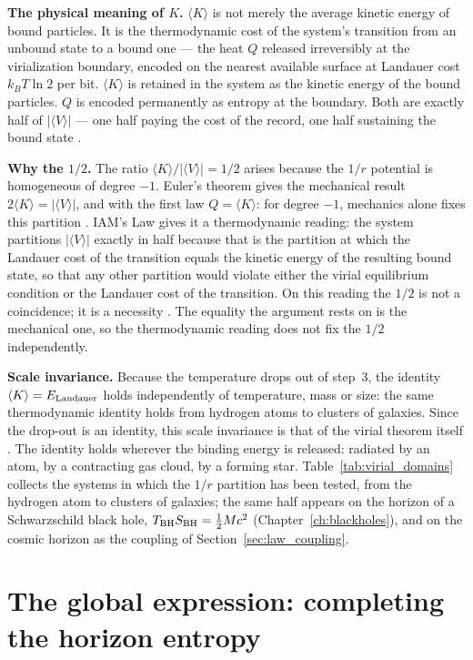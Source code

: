 \textbf{The physical meaning of $K$.} $\langle K\rangle$ is not merely the average kinetic energy of bound particles. It is the thermodynamic cost of the
system's transition from an unbound state to a bound one --- the heat $Q$ released irreversibly at the virialization boundary, encoded on the nearest
available surface at Landauer cost $k_BT\ln2$ per bit. $\langle K\rangle$ is retained in the system as the kinetic energy of the bound particles. $Q$ is
encoded permanently as entropy at the boundary. Both are exactly half of $|\langle V\rangle|$ --- one half paying the cost of the record, one half
sustaining the bound state \interp.

\textbf{Why the $1/2$.} The ratio $\langle K\rangle/|\langle V\rangle|=1/2$ arises because the $1/r$ potential is homogeneous of degree $-1$. Euler's
theorem gives the mechanical result $2\langle K\rangle=|\langle V\rangle|$, and with the first law $Q=\langle K\rangle$: for degree $-1$, mechanics alone
fixes this partition \derived. IAM's Law gives it a thermodynamic reading: the system partitions $|\langle V\rangle|$ exactly in half because that is the
partition at which the Landauer cost of the transition equals the kinetic energy of the resulting bound state, so that any other partition would violate
either the virial equilibrium condition or the Landauer cost of the transition. On this reading the $1/2$ is not a coincidence; it is a necessity
\conjecture. The equality the argument rests on is the mechanical one, so the thermodynamic reading does not fix the $1/2$ independently.

\textbf{Scale invariance.} Because the temperature drops out of step~3, the identity $\langle K\rangle=E_{\rm Landauer}$ holds independently of temperature,
mass or size: the same thermodynamic identity holds from hydrogen atoms to clusters of galaxies. Since the drop-out is an identity, this scale invariance
is that of the virial theorem itself \derived. The identity holds wherever the binding energy is released: radiated by an atom, by a contracting gas cloud,
by a forming star. Table~\ref{tab:virial_domains} collects the systems in which the $1/r$ partition has been tested, from the hydrogen atom to clusters of
galaxies; the same half appears on the horizon of a Schwarzschild black hole, $T_{\rm BH}S_{\rm BH}=\tfrac12Mc^2$ (Chapter~\ref{ch:blackholes}), and on the
cosmic horizon as the coupling of Section~\ref{sec:law_coupling}.

\section{The global expression: completing the horizon entropy}\label{sec:law_global}
